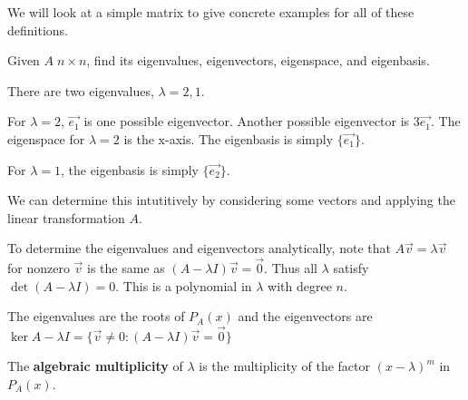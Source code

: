 \documentclass[../main.tex]{subfiles}
\begin{document}
We will look at a simple matrix to give concrete examples for all of these definitions.

\begin{example}[]
    Given \( A \; n \times n \), find its eigenvalues, eigenvectors, eigenspace, and eigenbasis.

    There are two eigenvalues, \( \lambda = 2, 1 \).

    For \( \lambda =2 \), \( \vec{e_1} \) is one possible eigenvector. Another possible eigenvector
    is \( 3\vec{e_1} \). The eigenspace for \( \lambda=2 \) is the x-axis. The eigenbasis is simply
    \( \{\vec{e_1}\} \).

    For \( \lambda=1 \), the eigenbasis is simply \( \{\vec{e_2}\} \).

    We can determine this intutitively by considering some vectors and applying the linear transformation \( A \).


\end{example}

To determine the eigenvalues and eigenvectors analytically, note that \( A\vec{v}=\lambda\vec{v} \) for nonzero \( \vec{v} \)
is the same as \( (A-\lambda I)\vec{v}=\vec{0} \). Thus all \( \lambda \) satisfy \( \det(A-\lambda I) =0 \). This is a polynomial
in \( \lambda \) with degree \( n \).

The eigenvalues are the roots of \( P_A(x) \) and the eigenvectors are \( \ker A - \lambda I = \{\vec{v} \neq 0 : (A- \lambda I)\vec{v} =\vec{0} \}\)

\begin{definition}
    The \textbf{algebraic multiplicity} of \( \lambda \) is the multiplicity of the factor \(  (x-\lambda)^m \) in \( P_A(x) \).
\end{definition}
\end{document}
